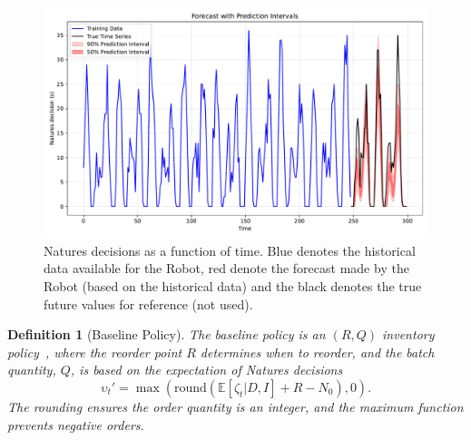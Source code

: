 \documentclass[a4paper,12pt]{article}
\newtheorem{definition}{Definition}
\begin{document}
	\begin{figure}[h!]
		\centering
		\includegraphics[width=1\textwidth]{figures/time_series.pdf}
		\caption{Natures decisions as a function of time. Blue denotes the historical data available for the Robot, red denote the forecast made by the Robot (based on the historical data) and the black denotes the true future values for reference (not used).}
		\label{fig:ts}
	\end{figure}
	\begin{definition}[Baseline Policy]  
		\label{def:baseline}
		The baseline policy is an $(R, Q)$ inventory policy~\citep{bartmann1992inventory,axsaeter2006inventory}, where the reorder point $R$ determines when to reorder, and the batch quantity, $Q$, is based on the expectation of Natures decisions
		\begin{equation}  
			\upsilon_t' = \max(\text{round}(\mathbb{E}[\zeta_t|D, I] + R - N_0), 0).  
		\end{equation}  
		The rounding ensures the order quantity is an integer, and the maximum function prevents negative orders.
	\end{definition}
		
\end{document}
